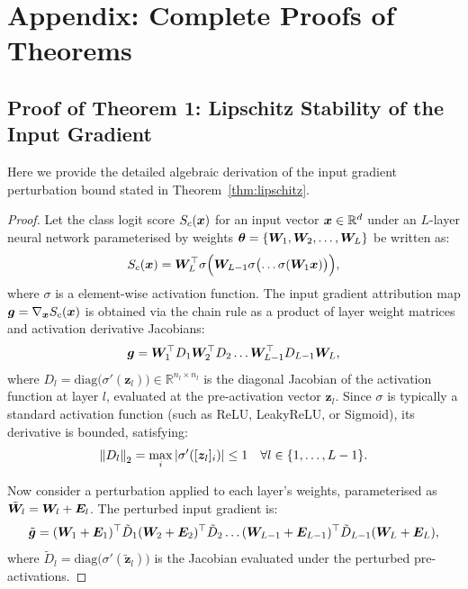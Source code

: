 \section{Appendix: Complete Proofs of Theorems}
\label{sec:appendix}

\subsection{Proof of Theorem 1: Lipschitz Stability of the Input Gradient}
Here we provide the detailed algebraic derivation of the input gradient perturbation bound stated in Theorem~\ref{thm:lipschitz}.

\begin{proof}
Let the class logit score $S_c(\bm{x})$ for an input vector $\bm{x} \in \mathbb{R}^d$ under an $L$-layer neural network parameterised by weights $\bm{\theta} = \{\bm{W}_1, \bm{W}_2, \dots, \bm{W}_L\}$ be written as:
\begin{equation}
S_c(\bm{x}) = \bm{W}_L^{\top} \sigma\Bigl(\bm{W}_{L-1} \sigma\bigl(\dots \sigma(\bm{W}_1 \bm{x})\bigr)\Bigr) ,
\end{equation}
where $\sigma$ is a element-wise activation function. The input gradient attribution map $\bm{g} = \nabla_{\bm{x}} S_c(\bm{x})$ is obtained via the chain rule as a product of layer weight matrices and activation derivative Jacobians:
\begin{equation}
\bg = \bW_1^{\top} D_1 \bW_2^{\top} D_2 \dots \bW_{L-1}^{\top} D_{L-1} \bW_L ,
\label{eq:gradchain}
\end{equation}
where $D_l = \mathrm{diag}\bigl(\sigma'(\bm{z}_l)\bigr) \in \mathbb{R}^{n_l \times n_l}$ is the diagonal Jacobian of the activation function at layer $l$, evaluated at the pre-activation vector $\bm{z}_l$. Since $\sigma$ is typically a standard activation function (such as ReLU, LeakyReLU, or Sigmoid), its derivative is bounded, satisfying:
\begin{equation}
\left\lVert D_l\right\rVert_2 = \max_i |\sigma'([\bm{z}_l]_i)| \le 1 \quad \forall l \in \{1, \dots, L-1\} .
\end{equation}

Now consider a perturbation applied to each layer's weights, parameterised as $\tilde{\bm{W}}_l = \bm{W}_l + \bm{E}_l$. The perturbed input gradient is:
\begin{equation}
\tilde{\bm{g}} = (\bm{W}_1 + \bm{E}_1)^{\top} \tilde{D}_1 (\bm{W}_2 + \bm{E}_2)^{\top} \tilde{D}_2 \dots (\bm{W}_{L-1} + \bm{E}_{L-1})^{\top} \tilde{D}_{L-1} (\bm{W}_L + \bm{E}_L) ,
\label{eq:perturbedgrad}
\end{equation}
where $\tilde{D}_l = \mathrm{diag}\bigl(\sigma'(\tilde{\bm{z}}_l)\bigr)$ is the Jacobian evaluated under the perturbed pre-activations.


\end{proof}
